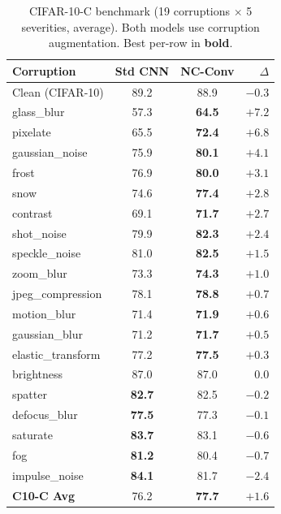 \documentclass[journal]{IEEEtran}
\begin{document}
\begin{table}[t]
\centering
\caption{CIFAR-10-C benchmark (19 corruptions $\times$ 5 severities, average). Both models use corruption augmentation. Best per-row in \textbf{bold}.}
\label{tab:cifar10c}
\small
\setlength{\tabcolsep}{3pt}
\begin{tabular}{@{}lcc r@{}}
\toprule
\textbf{Corruption} & \textbf{Std CNN} & \textbf{NC-Conv} & $\Delta$ \\
\midrule
Clean (CIFAR-10) & 89.2 & 88.9 & $-0.3$ \\
\midrule
glass\_blur       & 57.3 & \textbf{64.5} & $+7.2$ \\
pixelate          & 65.5 & \textbf{72.4} & $+6.8$ \\
gaussian\_noise   & 75.9 & \textbf{80.1} & $+4.1$ \\
frost             & 76.9 & \textbf{80.0} & $+3.1$ \\
snow              & 74.6 & \textbf{77.4} & $+2.8$ \\
contrast          & 69.1 & \textbf{71.7} & $+2.7$ \\
shot\_noise       & 79.9 & \textbf{82.3} & $+2.4$ \\
speckle\_noise    & 81.0 & \textbf{82.5} & $+1.5$ \\
zoom\_blur        & 73.3 & \textbf{74.3} & $+1.0$ \\
jpeg\_compression & 78.1 & \textbf{78.8} & $+0.7$ \\
motion\_blur      & 71.4 & \textbf{71.9} & $+0.6$ \\
gaussian\_blur    & 71.2 & \textbf{71.7} & $+0.5$ \\
elastic\_transform& 77.2 & \textbf{77.5} & $+0.3$ \\
brightness        & 87.0 & 87.0 & $0.0$ \\
spatter           & \textbf{82.7} & 82.5 & $-0.2$ \\
defocus\_blur     & \textbf{77.5} & 77.3 & $-0.1$ \\
saturate          & \textbf{83.7} & 83.1 & $-0.6$ \\
fog               & \textbf{81.2} & 80.4 & $-0.7$ \\
impulse\_noise    & \textbf{84.1} & 81.7 & $-2.4$ \\
\midrule
\textbf{C10-C Avg} & 76.2 & \textbf{77.7} & $\mathbf{+1.6}$ \\
\bottomrule
\end{tabular}
\end{table}
\end{document}
